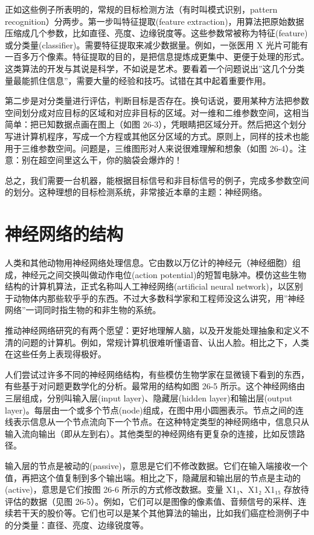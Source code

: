 正如这些例子所表明的，常规的目标检测方法（有时叫模式识别，pattern
recognition）分两步。第一步叫特征提取(feature
extraction)，用算法把原始数据压缩成几个参数，比如直径、亮度、边缘锐度等。这些参数常被称为特征(feature)或分类量(classifier)。需要特征提取来减少数据量。例如，一张医用
X
光片可能有一百多万个像素。特征提取的目的，是把信息提炼成更集中、更便于处理的形式。这类算法的开发与其说是科学，不如说是艺术。要看着一个问题说出''这几个分类量最能抓住信息''，需要大量的经验和技巧。试错在其中起着重要作用。

第二步是对分类量进行评估，判断目标是否存在。换句话说，要用某种方法把参数空间划分成对应目标的区域和对应非目标的区域。对一维和二维参数空间，这相当简单：把已知数据点画在图上（如图
26-3），凭眼睛把区域分开。然后把这个划分写进计算机程序，写成一个方程或其他区分区域的方式。原则上，同样的技术也能用于三维参数空间。问题是，三维图形对人来说很难理解和想象（如图
26-4）。注意：别在超空间里这么干，你的脑袋会爆炸的！

总之，我们需要一台机器，能根据目标信号和非目标信号的例子，完成多参数空间的划分。这种理想的目标检测系统，非常接近本章的主题：神经网络。

\section{神经网络的结构}

人类和其他动物用神经网络处理信息。它由数以万亿计的神经元（神经细胞）组成，神经元之间交换叫做动作电位(action
potential)的短暂电脉冲。模仿这些生物结构的计算机算法，正式名称叫人工神经网络(artificial
neural
network)，以区别于动物体内那些软乎乎的东西。不过大多数科学家和工程师没这么讲究，用''神经网络''一词同时指生物的和非生物的系统。

推动神经网络研究的有两个愿望：更好地理解人脑，以及开发能处理抽象和定义不清的问题的计算机。例如，常规计算机很难听懂语音、认出人脸。相比之下，人类在这些任务上表现得极好。

人们尝试过许多不同的神经网络结构，有些模仿生物学家在显微镜下看到的东西，有些基于对问题更数学化的分析。最常用的结构如图
26-5 所示。这个神经网络由三层组成，分别叫输入层(input
layer)、隐藏层(hidden layer)和输出层(output
layer)。每层由一个或多个节点(node)组成，在图中用小圆圈表示。节点之间的连线表示信息从一个节点流向下一个节点。在这种特定类型的神经网络中，信息只从输入流向输出（即从左到右）。其他类型的神经网络有更复杂的连接，比如反馈路径。

输入层的节点是被动的(passive)，意思是它们不修改数据。它们在输入端接收一个值，再把这个值复制到多个输出端。相比之下，隐藏层和输出层的节点是主动的(active)，意思是它们按图
26-6 所示的方式修改数据。变量 X1₁、X1₂  X1₁₅
存放待评估的数据（见图
26-5）。例如，它们可以是图像的像素值、音频信号的采样、连续若干天的股价等。它们也可以是某个其他算法的输出，比如我们癌症检测例子中的分类量：直径、亮度、边缘锐度等。

